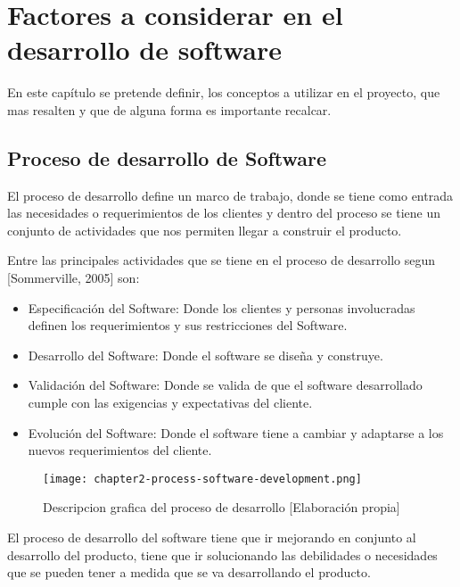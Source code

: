 \chapter{Factores a considerar en el desarrollo de software}
\noindent En este capítulo se pretende definir, los conceptos a utilizar en el proyecto, que mas resalten y que de alguna forma es importante recalcar.


\section{Proceso de desarrollo de Software}
\noindent El proceso de desarrollo define un marco de trabajo, donde se tiene como entrada las necesidades o requerimientos de los clientes y dentro del proceso se tiene un conjunto de actividades que nos permiten llegar a construir el producto.

\noindent Entre las principales actividades que se tiene en el proceso de desarrollo segun [Sommerville, 2005] son:
\begin{itemize}
  \item Especificación del Software: Donde los clientes y personas involucradas definen los requerimientos y sus restricciones del  Software.
  \item Desarrollo del Software: Donde el software se diseña y construye.
  \item Validación del Software: Donde se valida de que el software desarrollado cumple con las exigencias y expectativas del cliente.
  \item Evolución del Software: Donde el software tiene a cambiar y adaptarse a los nuevos requerimientos del cliente.
\end{itemize}

\begin{figure}[ht]
  \centering
  \texttt{[image: chapter2-process-software-development.png]}
  \caption{Descripcion grafica del proceso de desarrollo [Elaboración propia]}  
\end{figure}

\noindent El proceso de desarrollo del software tiene que ir mejorando en conjunto al desarrollo del producto, tiene que ir solucionando las debilidades o necesidades que se pueden tener a medida que se va desarrollando el producto.
 
